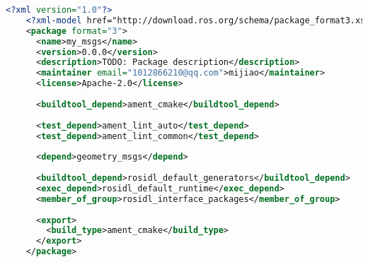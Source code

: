 \begin{lstlisting}[language=XML,label=lst:xml_2,caption=my\_msgs.xml]
    <?xml version="1.0"?>
    <?xml-model href="http://download.ros.org/schema/package_format3.xsd" schematypens="http://www.w3.org/2001/XMLSchema"?>
    <package format="3">
      <name>my_msgs</name>
      <version>0.0.0</version>
      <description>TODO: Package description</description>
      <maintainer email="1012866210@qq.com">mijiao</maintainer>
      <license>Apache-2.0</license>
    
      <buildtool_depend>ament_cmake</buildtool_depend>
    
      <test_depend>ament_lint_auto</test_depend>
      <test_depend>ament_lint_common</test_depend>
    
      <depend>geometry_msgs</depend>
    
      <buildtool_depend>rosidl_default_generators</buildtool_depend>
      <exec_depend>rosidl_default_runtime</exec_depend>
      <member_of_group>rosidl_interface_packages</member_of_group>
    
      <export>
        <build_type>ament_cmake</build_type>
      </export>
    </package>
    
\end{lstlisting}
